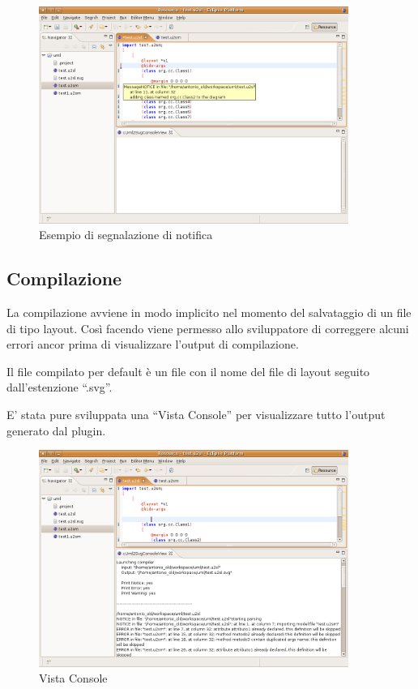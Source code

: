\begin{figure}[htp]
\begin{center}
  \includegraphics[width=0.9\textwidth]{img/notice}
  \caption[labelInTOC]{Esempio di segnalazione di notifica}
  \label{errorieditor} 
\end{center}
\end{figure}
 
 \subsection{Compilazione} 
La compilazione avviene in modo implicito nel momento del salvataggio di un file
di tipo layout. Così facendo viene permesso allo sviluppatore di correggere alcuni
errori ancor prima di visualizzare l'output di compilazione.

Il file compilato per default è un file con il nome del file di layout seguito
dall'estenzione ``.svg''.

E' stata pure sviluppata una ``Vista Console'' per visualizzare tutto l'output
generato dal plugin.

\begin{figure}[htp]
\begin{center}
  \includegraphics[width=0.9\textwidth]{img/console_view}
  \caption[labelInTOC]{Vista Console}
  \label{errorieditor} 
\end{center}
\end{figure}